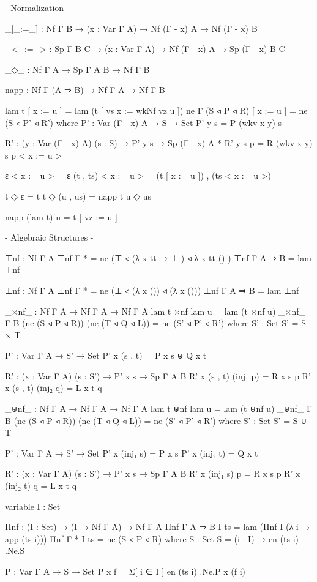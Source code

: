 \begin{code}
{- Normalization -}

_[_:=_] : Nf Γ B → (x : Var Γ A) → Nf (Γ - x) A → Nf (Γ - x) B

_<_:=_> : Sp Γ B C → (x : Var Γ A) → Nf (Γ - x) A → Sp (Γ - x) B C

_◇_ : Nf Γ A → Sp Γ A B → Nf Γ B

napp : Nf Γ (A ⇒ B) → Nf Γ A → Nf Γ B

lam t [ x := u ] = lam (t [ vs x := wkNf vz u ])
ne {Γ} (S ◃ P ◃ R) [ x := u ] = ne (S ◃ P' ◃ R')
  where
  P' : Var (Γ - x) A → S → Set
  P' y s = P (wkv x y) s
  
  R' : (y : Var (Γ - x) A) (s : S) → P' y s → Sp (Γ - x) A *
  R' y s p = R (wkv x y) s p < x := u >

ε < x := u > = ε
(t , ts) < x := u > = (t [ x := u ]) , (ts < x := u >)

t ◇ ε = t
t ◇ (u , us) = napp t u ◇ us

napp (lam t) u = t [ vz := u ]

{- Algebraic Structures -}

⊤nf : Nf Γ A
⊤nf {Γ} {*} = ne (⊤ ◃ (λ{ x tt → ⊥ }) ◃ λ{ x tt () })
⊤nf {Γ} {A ⇒ B} = lam ⊤nf

⊥nf : Nf Γ A
⊥nf {Γ} {*} = ne (⊥ ◃ (λ x ()) ◃ (λ x ()))
⊥nf {Γ} {A ⇒ B} = lam ⊥nf

_×nf_ : Nf Γ A → Nf Γ A → Nf Γ A
lam t ×nf lam u = lam (t ×nf u)
_×nf_ {Γ} {B} (ne (S ◃ P ◃ R)) (ne (T ◃ Q ◃ L)) = ne (S' ◃ P' ◃ R')
  where
  S' : Set
  S' = S × T

  P' : Var Γ A → S' → Set
  P' x (s , t) = P x s ⊎ Q x t

  R' : (x : Var Γ A) (s : S') → P' x s → Sp Γ A B
  R' x (s , t) (inj₁ p) = R x s p
  R' x (s , t) (inj₂ q) = L x t q

_⊎nf_ : Nf Γ A → Nf Γ A → Nf Γ A
lam t ⊎nf lam u = lam (t ⊎nf u)
_⊎nf_ {Γ} {B} (ne (S ◃ P ◃ R)) (ne (T ◃ Q ◃ L)) = ne (S' ◃ P' ◃ R')
  where
  S' : Set
  S' = S ⊎ T

  P' : Var Γ A → S' → Set
  P' x (inj₁ s) = P x s
  P' x (inj₂ t) = Q x t

  R' : (x : Var Γ A) (s : S') → P' x s → Sp Γ A B
  R' x (inj₁ s) p = R x s p
  R' x (inj₂ t) q = L x t q

variable I : Set

Πnf : (I : Set) → (I → Nf Γ A) → Nf Γ A
Πnf {Γ} {A ⇒ B} I ts = lam (Πnf I (λ i → app (ts i)))
Πnf {Γ} {*} I ts = ne (S ◃ P ◃ R)
  where
  S : Set
  S = (i : I) → en (ts i) .Ne.S

  P : Var Γ A → S → Set
  P x f = Σ[ i ∈ I ] en (ts i) .Ne.P x (f i)


\end{code}

